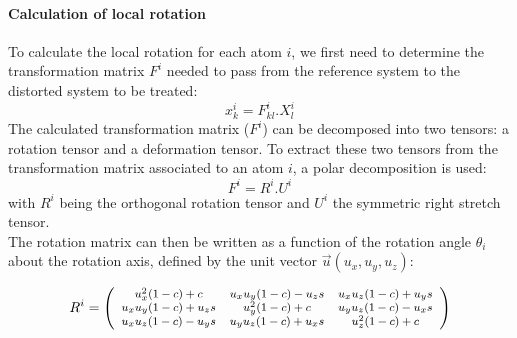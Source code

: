 \documentclass[final,3p,times,twocolumn]{elsarticle}
\begin{document}
\paragraph{Calculation of local rotation}
To calculate the local rotation for each atom $i$, we first need to determine the transformation matrix $ F^{i} $ needed to pass from the reference system to the distorted system to be treated:
\begin{equation}
x_{k}^{i}=F_{kl}^{i}.X_{l}^{i}
\end{equation}
The calculated transformation matrix ($ F^{i} $) can be decomposed into two tensors: a rotation tensor and a deformation tensor. To extract these two tensors from the transformation matrix associated to an atom $ i $, a polar decomposition is used:
\begin{equation}
F^{i}=R^{i}.U^{i}
\end{equation}
with $ R^{i} $ being the orthogonal rotation tensor and $ U^{i} $ the symmetric right stretch tensor. \\ 
The rotation matrix can then be written as a function of the rotation angle $ \theta_{i} $ about the rotation axis, defined by the unit vector $ \overrightarrow{u} (u_{x},u_{y},u_{z})$:

\begin{equation}
	R^{i}=\begin{footnotesize}\left(
	\begin{array}{ccc}
	u_{x}^{2}(1-c)+c & u_{x}u_{y}(1-c)-u_{z}s & u_{x}u_{z}(1-c)+u_{y}s \\
	u_{x}u_{y}(1-c)+u_{z}s & u_{y}^{2}(1-c)+c & u_{y}u_{z}(1-c)-u_{x}s \\
	u_{x}u_{z}(1-c)-u_{y}s & u_{y}u_{z}(1-c)+u_{x}s & u_{z}^{2}(1-c)+c \\
	\end{array}
	\right)\end{footnotesize}
\end{equation}
\end{document}
